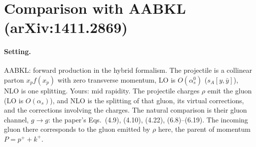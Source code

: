 \documentclass[10pt]{article}
\numberwithin{equation}{section}
\begin{document}
\section{Comparison with AABKL (arXiv:1411.2869)}\label{sec:aabkl}
\paragraph{Setting.} AABKL: forward production in the hybrid formalism. The projectile is a collinear parton $x_pf(x_p)$ with zero transverse momentum, LO is $O(\alpha_s^0)$ ($s_A[y,\bar y]$), NLO is one splitting. Yours: mid rapidity. The projectile charges $\rho$ emit the gluon (LO is $O(\alpha_s)$), and NLO is the splitting of that gluon, its virtual corrections, and the corrections involving the charges. The natural comparison is their gluon channel, $g\to g$: the paper's Eqs.~(4.9), (4.10), (4.22), (6.8)--(6.19). The incoming gluon there corresponds to the gluon emitted by $\rho$ here, the parent of momentum $P=p^++k^+$.
\end{document}

